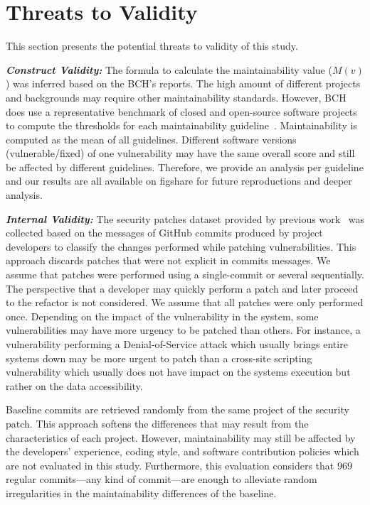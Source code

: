 \documentclass[smallextended]{svjour3}       %
\begin{document}
\section{Threats to Validity}\label{sec:threats}
%
This section presents the potential threats to validity of this study.
%

\textit{\textbf{Construct Validity:}} The formula to calculate the maintainability value ($M(v)$) was inferred based 
on the BCH's reports. The high amount of different projects and backgrounds 
may require other maintainability standards. However, BCH does use a 
representative benchmark of closed and open-source software projects to compute 
the thresholds for each maintainability guideline~\cite{Visser:2016:OREILLY,baggen2012}.
Maintainability is computed as the mean of all guidelines. Different software versions 
(vulnerable/fixed) of one vulnerability may have the same overall score
and still be affected by different guidelines. Therefore, we provide
an analysis per guideline and our results are all available on figshare for future reproductions and deeper analysis. 

\textit{\textbf{Internal Validity:}} The security patches dataset provided by previous
work~\cite{Reis:2017:IJSSE} was collected based on the messages of GitHub
commits produced by project developers to classify the changes performed while 
patching vulnerabilities. This approach discards patches that were
not explicit in commits messages. We assume that patches were performed 
using a single-commit or several sequentially. The 
perspective that a 
developer may quickly perform a patch and later 
proceed to the refactor is not considered. We assume 
that all patches were only performed once. Depending 
on the impact of the vulnerability in the system, some 
vulnerabilities may have more urgency to be patched than 
others. For instance, a vulnerability performing a Denial-of-Service attack
which usually brings entire systems down may be more urgent to patch than a 
cross-site scripting vulnerability which usually does not have impact
on the systems execution but rather on the data accessibility.

Baseline commits are retrieved randomly from 
the same project of the security patch.
This approach softens the differences
that may result from the characteristics of each project. However,
maintainability may still be affected by the developers' experience, coding
style, and software contribution policies which are not evaluated in this study.
Furthermore, this evaluation considers that $969$ regular commits---any kind
of commit---are enough to
alleviate random irregularities in the maintainability differences of the
baseline. 
%
\end{document}
